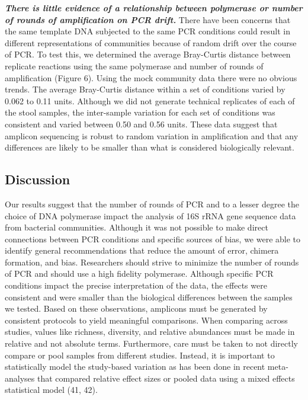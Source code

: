\documentclass[11pt,]{article}
\begin{document}
\textbf{\emph{There is little evidence of a relationship between
polymerase or number of rounds of amplification on PCR drift.}} There
have been concerns that the same template DNA subjected to the same PCR
conditions could result in different representations of communities
because of random drift over the course of PCR. To test this, we
determined the average Bray-Curtis distance between replicate reactions
using the same polymerase and number of rounds of amplification (Figure
6). Using the mock community data there were no obvious trends. The
average Bray-Curtis distance within a set of conditions varied by 0.062
to 0.11 units. Although we did not generate technical replicates of each
of the stool samples, the inter-sample variation for each set of
conditions was consistent and varied between 0.50 and 0.56 units. These
data suggest that amplicon sequencing is robust to random variation in
amplification and that any differences are likely to be smaller than
what is considered biologically relevant.

\newpage

\hypertarget{discussion}{%
\subsection{Discussion}\label{discussion}}

Our results suggest that the number of rounds of PCR and to a lesser
degree the choice of DNA polymerase impact the analysis of 16S rRNA gene
sequence data from bacterial communities. Although it was not possible
to make direct connections between PCR conditions and specific sources
of bias, we were able to identify general recommendations that reduce
the amount of error, chimera formation, and bias. Researchers should
strive to minimize the number of rounds of PCR and should use a high
fidelity polymerase. Although specific PCR conditions impact the precise
interpretation of the data, the effects were consistent and were smaller
than the biological differences between the samples we tested. Based on
these observations, amplicons must be generated by consistent protocols
to yield meaningful comparisons. When comparing across studies, values
like richness, diversity, and relative abundances must be made in
relative and not absolute terms. Furthermore, care must be taken to not
directly compare or pool samples from different studies. Instead, it is
important to statistically model the study-based variation as has been
done in recent meta-analyses that compared relative effect sizes or
pooled data using a mixed effects statistical model (41, 42).
\end{document}
